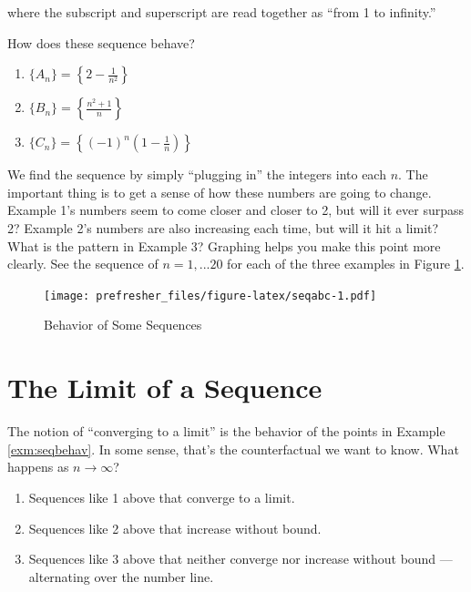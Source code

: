 \documentclass[]{book}
\providecommand{\tightlist}{%
  \setlength{\itemsep}{0pt}\setlength{\parskip}{0pt}}
\theoremstyle{definition}
\theoremstyle{definition}
\theoremstyle{definition}
\theoremstyle{remark}
\let\BeginKnitrBlock\begin \let\EndKnitrBlock\end
\begin{document}
where the subscript and superscript are read together as ``from 1 to infinity.''

\BeginKnitrBlock{example}[Sequences]
\protect\hypertarget{exm:seqbehav}{}{\label{exm:seqbehav} {} }
How does these sequence behave?

\begin{enumerate}
\def\labelenumi{\arabic{enumi}.}
\tightlist
\item
  \(\{A_n\}=\left\{ 2-\frac{1}{n^2} \right\}\)
\item
  \(\{B_n\}=\left\{\frac{n^2+1}{n} \right\}\)
\item
  \(\{C_n\}=\left\{(-1)^n \left(1-\frac{1}{n}\right) \right\}\)
\end{enumerate}
\EndKnitrBlock{example}

We find the sequence by simply ``plugging in'' the integers into each \(n\). The important thing is to get a sense of how these numbers are going to change. Example 1's numbers seem to come closer and closer to 2, but will it ever surpass 2? Example 2's numbers are also increasing each time, but will it hit a limit? What is the pattern in Example 3? Graphing helps you make this point more clearly. See the sequence of \(n = 1, ...20\) for each of the three examples in Figure \ref{fig:seqabc}.

\begin{figure}
\centering
\texttt{[image: prefresher\_files/figure-latex/seqabc-1.pdf]}
\caption{\label{fig:seqabc}Behavior of Some Sequences}
\end{figure}

\hypertarget{the-limit-of-a-sequence}{%
\section{The Limit of a Sequence}\label{the-limit-of-a-sequence}}

The notion of ``converging to a limit'' is the behavior of the points in Example \ref{exm:seqbehav}. In some sense, that's the counterfactual we want to know. What happens as \(n\rightarrow \infty\)?

\begin{enumerate}
\def\labelenumi{\arabic{enumi}.}
\tightlist
\item
  Sequences like 1 above that converge to a limit.
\item
  Sequences like 2 above that increase without bound.
\item
  Sequences like 3 above that neither converge nor increase without bound --- alternating over the number line.
\end{enumerate}
\end{document}
